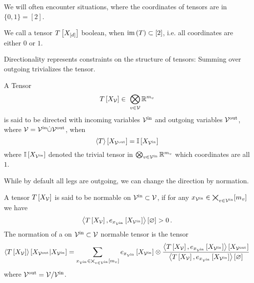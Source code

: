 
We will often encounter situations, where the coordinates of tensors are in $\{0,1\}=[2]$.

\begin{definition}\label{def:booleanTensor} %
	We call a tensor $T\left[X_{[d]}\right]$ boolean, when $\mathrm{im}\left(T\right)\subset[2]$, i.e. all coordinates are either $0$ or $1$.
\end{definition}

Directionality represents constraints on the structure of tensors:
Summing over outgoing trivializes the tensor.

\begin{definition}\label{def:directedTensor}
	A Tensor
		\[ \hypercoreat{\nodevariables} \in \bigotimes_{\nodein}\rr^{\catdimof{\node}} \]
	is said to be directed with incoming variables $\mathcal{V}^{\mathrm{in}}$ and outgoing variables $\mathcal{V}^{\mathrm{out}}$, where $\mathcal{V}=\mathcal{V}^{\mathrm{in}}\dot{\cup}\mathcal{V}^{\mathrm{out}}$, when
		\[ \left\langle T\right\rangle \left[ X_{\mathcal{V}^{\mathrm{out}}} \right] =  \mathbb{I}\left[X_{\mathcal{V}^{\mathrm{in}}}\right] \]
	where $\mathbb{I}\left[X_{\mathcal{V}^{\mathrm{in}}}\right]$ denoted the trivial tensor in  $\bigotimes_{v\in\mathcal{V}^{\mathrm{in}}}\mathbb{R}^{m_{v}}$ which coordinates are all $1$.
\end{definition}

While by default all legs are outgoing, we can change the direction by normation.

\begin{definition}\label{def:normation}
	A tensor $T\left[X_{\mathcal{V}}\right]$ is said to be normable on $\mathcal{V}^{\mathrm{in}}\subset\mathcal{V}$, if for any $x_{\mathcal{V}^{\mathrm{in}}}\in\bigtimes_{v\in\mathcal{V}^{\mathrm{in}}}[m_{v}]$ we have
		\[ \left\langle T\left[X_{\mathcal{V}}\right],e_{x_{\mathcal{V}^{\mathrm{in}}}}\left[X_{\mathcal{V}^{\mathrm{in}}}\right]\right\rangle \left[ \varnothing \right] > 0 \, . \]
	The normation of a on $\mathcal{V}^{\mathrm{in}}\subset\mathcal{V}$ normable tensor is the tensor
	\begin{align*}
		\left\langle T\left[X_{\mathcal{V}}\right]\right\rangle \left[ X_{\mathcal{V}^{\mathrm{out}}} | X_{\mathcal{V}^{\mathrm{in}}} \right] =
		\sum_{x_{\mathcal{V}^{\mathrm{in}}}\in\bigtimes_{v\in\mathcal{V}^{\mathrm{in}}}[m_{v}]}
		e_{x_{\mathcal{V}^{\mathrm{in}}}}\left[X_{\mathcal{V}^{\mathrm{in}}}\right] \otimes \frac{
		\left\langle T\left[X_{\mathcal{V}}\right],e_{x_{\mathcal{V}^{\mathrm{in}}}}\left[X_{\mathcal{V}^{\mathrm{in}}}\right]\right\rangle \left[ X_{\mathcal{V}^{\mathrm{out}}} \right]
		}{
		\left\langle T\left[X_{\mathcal{V}}\right],e_{x_{\mathcal{V}^{\mathrm{in}}}}\left[X_{\mathcal{V}^{\mathrm{in}}}\right]\right\rangle \left[ \varnothing \right]
		}
	\end{align*}
	where $\mathcal{V}^{\mathrm{out}} = \mathcal{V}/\mathcal{V}^{\mathrm{in}}$.
\end{definition}

